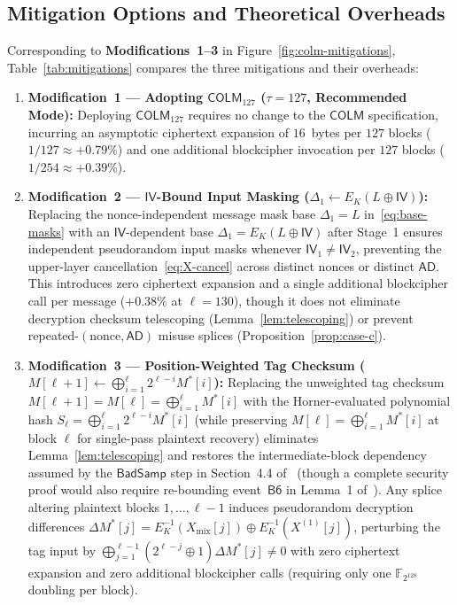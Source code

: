 \documentclass[11pt,a4paper]{article}
\theoremstyle{definition}
\theoremstyle{remark}
\newcommand{\FtwoN}{\mathbb{F}_{2^{128}}}
\newcommand{\COLM}{\mathsf{COLM}}
\newcommand{\COLMott}{\mathsf{COLM}_{127}}
\newcommand{\IV}{\mathsf{IV}}
\newcommand{\AD}{\mathsf{AD}}
\begin{document}
\subsection{Mitigation Options and Theoretical Overheads}
Corresponding to \textbf{Modifications~1--3} in Figure~\ref{fig:colm-mitigations}, Table~\ref{tab:mitigations} compares the three mitigations and their overheads:
\begin{enumerate}[leftmargin=2em]
    \item \textbf{Modification~1 --- Adopting $\COLMott$ ($\tau = 127$, Recommended Mode):} Deploying $\COLMott$ requires no change to the $\COLM$ specification, incurring an asymptotic ciphertext expansion of $16$~bytes per $127$ blocks ($1/127 \approx +0.79\%$) and one additional blockcipher invocation per $127$ blocks ($1/254 \approx +0.39\%$).
    \item \textbf{Modification~2 --- $\IV$-Bound Input Masking ($\Delta_1 \leftarrow E_K(L \oplus \IV)$):} Replacing the nonce-independent message mask base $\Delta_1 = L$ in~\eqref{eq:base-masks} with an $\IV$-dependent base $\Delta_1 = E_K(L \oplus \IV)$ after Stage~1 ensures independent pseudorandom input masks whenever $\IV_1 \neq \IV_2$, preventing the upper-layer cancellation~\eqref{eq:X-cancel} across distinct nonces or distinct $\AD$. This introduces zero ciphertext expansion and a single additional blockcipher call per message ($+0.38\%$ at $\ell = 130$), though it does not eliminate decryption checksum telescoping (Lemma~\ref{lem:telescoping}) or prevent repeated-$(\text{nonce}, \AD)$ misuse splices (Proposition~\ref{prop:case-c}).
    \item \textbf{Modification~3 --- Position-Weighted Tag Checksum ($M[\ell+1] \leftarrow \bigoplus_{i=1}^\ell 2^{\ell-i} M^*[i]$):} Replacing the unweighted tag checksum $M[\ell+1] = M[\ell] = \bigoplus_{i=1}^\ell M^*[i]$ with the Horner-evaluated polynomial hash $S_\ell = \bigoplus_{i=1}^\ell 2^{\ell-i} M^*[i]$ (while preserving $M[\ell] = \bigoplus_{i=1}^\ell M^*[i]$ at block $\ell$ for single-pass plaintext recovery) eliminates Lemma~\ref{lem:telescoping} and restores the intermediate-block dependency assumed by the $\mathsf{BadSamp}$ step in Section~4.4 of~\cite{COLM24} (though a complete security proof would also require re-bounding event~$\mathsf{B6}$ in Lemma~1 of~\cite{COLM24}). Any splice altering plaintext blocks $1, \dots, \ell-1$ induces pseudorandom decryption differences $\Delta M^*[j] = E_K^{-1}(X_{\mathrm{mix}}[j]) \oplus E_K^{-1}(X^{(1)}[j])$, perturbing the tag input by $\bigoplus_{j=1}^{\ell-1} (2^{\ell-j} \oplus 1)\Delta M^*[j] \neq 0$ with zero ciphertext expansion and zero additional blockcipher calls (requiring only one $\FtwoN$ doubling per block).
\end{enumerate}
\end{document}
